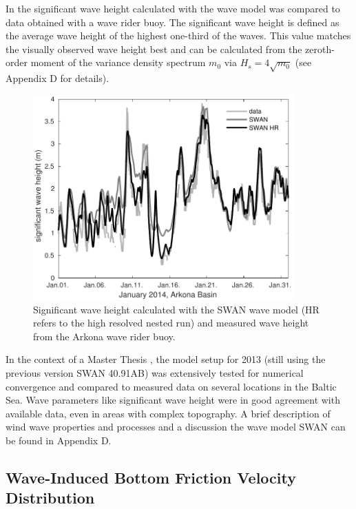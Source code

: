 In  the significant wave height calculated with the wave model was 
compared to data obtained with a wave rider buoy. The significant wave height 
is defined as the average wave height of the highest one-third of the waves. 
This value matches the visually observed wave height best and can be calculated 
from the zeroth-order moment of the variance density spectrum $m_0$ via 
$H_s = 4 \sqrt{m_0}$ (see Appendix D for details).
\begin{figure}[ht]
 \includegraphics[width=10cm]{bilder/januar.pdf}
 \caption{Significant wave height calculated with the SWAN wave model (HR 
refers to the high resolved nested run) and measured wave height from the 
Arkona wave rider buoy.\label{verify}}
\end{figure}

In the context of a Master Thesis \citep[][]{masterarbeitronja}, the model 
setup for 2013 (still using the previous version SWAN 40.91AB) was 
extensively tested for numerical convergence and compared to measured data on 
several locations in the Baltic Sea. Wave parameters like significant wave 
height were in good agreement with available data, even in areas with complex 
topography. A brief description of wind wave properties and processes and a 
discussion the wave model SWAN can be found in Appendix D.

\subsection{Wave-Induced Bottom Friction Velocity Distribution}

